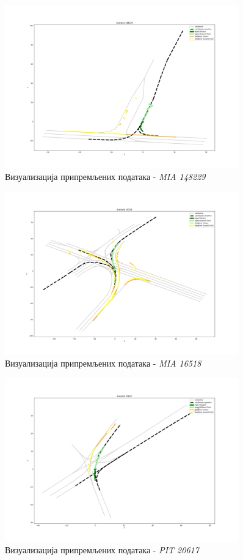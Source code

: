 \documentclass[11pt,oneside]{memoir}
\begin{document}
\begin{figure}[H]
  \includegraphics[width=0.9\textwidth]{images/scenario_MIA_148229.png}
  \caption{Визуализација припремљених података - \textit{MIA 148229}}
  \label{scenario-example-MIA-148229}
\end{figure}

\begin{figure}[H]
  \includegraphics[width=0.9\textwidth]{images/scenario_MIA_16518.png}
  \caption{Визуализација припремљених података - \textit{MIA 16518}}
  \label{scenario-example-MIA-16518}
\end{figure}

\begin{figure}[H]
  \includegraphics[width=0.9\textwidth]{images/scenario_PIT_20617.png}
  \caption{Визуализација припремљених података - \textit{PIT 20617}}
  \label{scenario-example-PIT-20617}
\end{figure}
\end{document}
